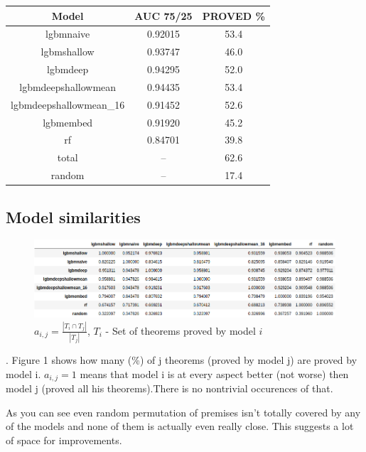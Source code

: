 \documentclass{article} %
\begin{document}
\begin{center}
 \begin{tabular}{||c | c | c||} 
 \hline
 Model & AUC 75/25 & PROVED \% \\ [0.5ex] 
 \hline\hline
 lgbmnaive & 0.92015 & 53.4 \\ 
 \hline
 lgbmshallow & 0.93747 & 46.0 \\
 \hline
 lgbmdeep & 0.94295 & 52.0 \\
 \hline
 lgbmdeepshallowmean  & 0.94435 & 53.4\\
 \hline
 lgbmdeepshallowmean\_16 & 0.91452 & 52.6 \\
 \hline
 lgbmembed & 0.91920 & 45.2 \\
 \hline
 rf & 0.84701 & 39.8 \\
 \hline
 total & -- & 62.6 \\ 
 \hline
 random & -- & 17.4 \\ [1ex] 
 \hline
\end{tabular}
\end{center}



\subsection{Model similarities}





\begin{figure}[!htb]
  \includegraphics[width=\linewidth]{model_dependencies.png}
  \caption{
    $a_{i,j} = \frac{|T_i \cap T_j|}{|T_j|}$,
$ T_i $ - Set of theorems proved by model $i$
  }
  \label{fig:modelsims}
\end{figure}
.\newline
Figure 1 shows how many (\%) of j theorems (proved by model j) are proved by model i. $a_{i,j} = 1$ means that model i is at every aspect better (not worse) then model j (proved all his theorems).There is no nontrivial occurences of that.

As you can see even random permutation of premises isn't totally covered by any of the models and none of them is actually even really close. This suggests a lot of space for improvements.
\end{document}
